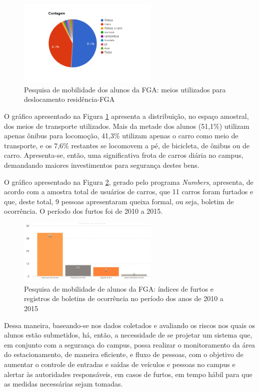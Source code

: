\begin{figure}[H]
	\centering
	\includegraphics[width=0.6\textwidth]{figuras/resultadoquestionario}
	\caption{Pesquisa de mobilidade dos alunos da FGA: meios utilizados para deslocamento residência-FGA}
	\label{img:resultadoquestionario}
\end{figure}

O gráfico apresentado na Figura \ref{img:resultadoquestionario} apresenta a distribuição, no espaço amostral, dos meios  de transporte utilizados. Mais da metade dos alunos (51,1\%) utilizam apenas ônibus para locomoção, 41,3\% utilizam apenas o carro como meio de transporte, e os 7,6\% restantes se locomovem a pé, de bicicleta, de ônibus ou de carro. Apresenta-se, então, uma significativa frota de carros diária no campus, demandando maiores investimentos para segurança destes bens.

O gráfico apresentado na Figura \ref{img:resultadoquestionario2}, gerado pelo programa \emph{Numbers}, apresenta, de acordo com a amostra total de usuários de carros, que 11 carros foram furtados e que, deste total, 9 pessoas apresentaram queixa formal, ou seja, boletim de ocorrência. O período dos furtos foi de 2010 a 2015.

\begin{figure}[H]
	\centering
	\includegraphics[width=0.6\textwidth]{figuras/resultadoquestionario2}
	\caption{Pesquisa de mobilidade de alunos da FGA: índices de furtos e registros de boletins de ocorrência no período dos anos de 2010 a 2015}
	\label{img:resultadoquestionario2}
\end{figure}

Dessa maneira, baseando-se nos dados coletados e avaliando os riscos nos quais os alunos estão submetidos, há, então, a necessidade de se projetar  um sistema que, em conjunto com a segurança do campus, possa realizar o monitoramento  da área do estacionamento, de maneira eficiente, e fluxo de pessoas, com o objetivo de aumentar o controle de entradas e saídas de veículos e pessoas no campus e alertar às autoridades responsáveis, em casos de furtos, em tempo hábil para que as medidas necessárias sejam tomadas.

